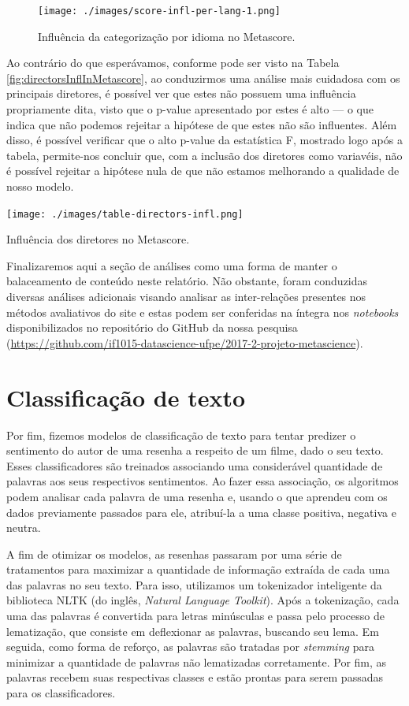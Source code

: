 \documentclass[review]{elsarticle}
\begin{document}
\begin{figure}[ht]
  \centering
  \texttt{[image: ./images/score-infl-per-lang-1.png]}
  \caption{Influência da categorização por idioma no Metascore.}
  \label{fig:langInflInMetascore}
\end{figure}

Ao contrário do que esperávamos, conforme pode ser visto na Tabela \ref{fig:directorsInflInMetascore}, ao conduzirmos uma análise mais cuidadosa com os principais diretores, é possível ver que estes não possuem uma influência propriamente dita, visto que o p-value apresentado por estes é alto — o que indica que não podemos rejeitar a hipótese de que estes não são influentes. Além disso, é possível verificar que o alto p-value da estatística F, mostrado logo após a tabela, permite-nos concluir que, com a inclusão dos diretores como variavéis, não é possível rejeitar a hipótese nula de que não estamos melhorando a qualidade de nosso modelo.

\begin{table}[h]
  \centering
  \texttt{[image: ./images/table-directors-infl.png]}
  \caption{Influência dos diretores no Metascore.}
  \label{fig:directorsInflInMetascore}
\end{table}

Finalizaremos aqui a seção de análises como uma forma de manter o balaceamento de conteúdo neste relatório. Não obstante, foram conduzidas diversas análises adicionais visando analisar as inter-relações presentes nos métodos avaliativos do site e estas podem ser conferidas na íntegra nos \textit{notebooks} disponibilizados no repositório do GitHub da nossa pesquisa (\url{https://github.com/if1015-datascience-ufpe/2017-2-projeto-metascience}).

\section{Classificação de texto}

Por fim, fizemos modelos de classificação de texto para tentar predizer o sentimento do autor de uma resenha a respeito de um filme, dado o seu texto. Esses classificadores são treinados associando uma considerável quantidade de palavras aos seus respectivos sentimentos. Ao fazer essa associação, os algoritmos podem analisar cada palavra de uma resenha e, usando o que aprendeu com os dados previamente passados para ele, atribuí-la a uma classe positiva, negativa e neutra.  

A fim de otimizar os modelos, as resenhas passaram por uma série de tratamentos para maximizar a quantidade de informação extraída de cada uma das palavras no seu texto. Para isso, utilizamos um tokenizador inteligente da biblioteca NLTK (do inglês, \textit{Natural Language Toolkit}). Após a tokenização, cada uma das palavras é convertida para letras minúsculas e passa pelo processo de lematização, que consiste em deflexionar as palavras, buscando seu lema. Em seguida, como forma de reforço, as palavras são tratadas por \textit{stemming} para minimizar a quantidade de palavras não lematizadas corretamente. Por fim, as palavras recebem suas respectivas classes e estão prontas para serem passadas para os classificadores.
\end{document}
